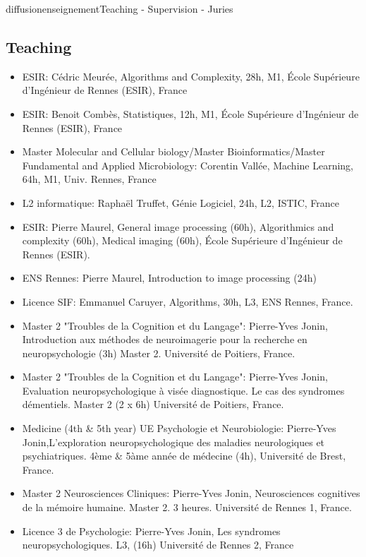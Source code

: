 \documentclass{ra2018}
\begin{document}
\begin{module}{diffusion}{enseignement}{Teaching - Supervision - Juries}

\subsection {Teaching}

\begin{itemize}
    \item ESIR: Cédric Meurée, Algorithms and Complexity, 28h, M1, École Supérieure d’Ingénieur de Rennes (ESIR), France
    \item ESIR: Benoit Combès, Statistiques, 12h, M1, École Supérieure d’Ingénieur de Rennes (ESIR), France
    \item Master Molecular and Cellular biology/Master Bioinformatics/Master Fundamental and Applied Microbiology: Corentin Vallée, Machine Learning, 64h, M1, Univ. Rennes, France
    \item L2 informatique: Raphaël Truffet, Génie Logiciel, 24h, L2, ISTIC, France
    \item ESIR: Pierre Maurel, General image processing (60h), Algorithmics and complexity (60h), Medical imaging (60h), École Supérieure d’Ingénieur de Rennes (ESIR).
    \item ENS Rennes: Pierre Maurel, Introduction to image processing (24h)
    \item Licence SIF: Emmanuel Caruyer, Algorithms, 30h, L3, ENS Rennes, France.
    \item Master 2 "Troubles de la Cognition et du Langage": Pierre-Yves Jonin, Introduction aux méthodes de neuroimagerie pour la recherche en neuropsychologie (3h) Master 2. Université de Poitiers, France.
    \item Master 2 "Troubles de la Cognition et du Langage": Pierre-Yves Jonin, Evaluation neuropsychologique à visée diagnostique. Le cas des syndromes démentiels. Master 2 (2 x 6h) Université de Poitiers, France.
    \item Medicine (4th \& 5th year) UE Psychologie et Neurobiologie: Pierre-Yves Jonin,L'exploration neuropsychologique des maladies neurologiques et psychiatriques. 4\`eme \& 5\`ame année de m\'edecine (4h), Universit\'e de Brest, France.
    \item Master 2 Neurosciences Cliniques: Pierre-Yves Jonin, Neurosciences cognitives de la mémoire humaine. Master 2. 3 heures. Université de Rennes 1, France.
    \item Licence 3 de Psychologie: Pierre-Yves Jonin, Les syndromes neuropsychologiques. L3, (16h) Université de Rennes 2, France

\end{itemize}
\end{module}
\end{document}

